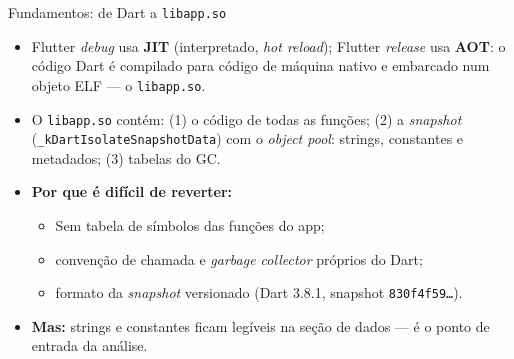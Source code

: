 \documentclass[aspectratio=169]{beamer}
\begin{document}
\begin{frame}{Fundamentos: de Dart a \texttt{libapp.so}}
  \begin{itemize}
    \item Flutter \emph{debug} usa \textbf{JIT} (interpretado, \emph{hot
          reload}); Flutter \emph{release} usa \textbf{AOT}: o código Dart é
          compilado para \alert{código de máquina nativo} e embarcado num
          objeto ELF --- o \texttt{libapp.so}.
    \item O \texttt{libapp.so} contém: (1) o código de todas as funções;
          (2) a \emph{snapshot} (\texttt{\_kDartIsolateSnapshotData}) com o
          \emph{object pool}: strings, constantes e metadados; (3) tabelas do GC.
    \item \textbf{Por que é difícil de reverter:}
      \begin{itemize}
        \item \alert{Sem tabela de símbolos} das funções do app;
        \item convenção de chamada e \emph{garbage collector} próprios do Dart;
        \item formato da \emph{snapshot} \alert{versionado} (Dart 3.8.1, snapshot
              \texttt{830f4f59\ldots}).
      \end{itemize}
    \item \textbf{Mas:} strings e constantes ficam \alert{legíveis} na seção de
          dados --- é o ponto de entrada da análise.
  \end{itemize}
\end{frame}
\end{document}
